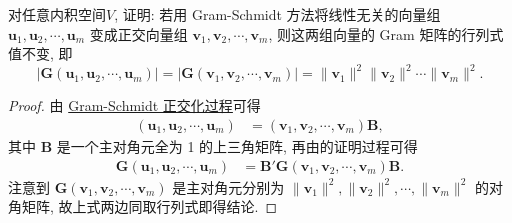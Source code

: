 \documentclass[../../main.tex]{subfiles}%
\begin{document}
\begin{proposition}\label{proposition:例9.15}
对任意内积空间$V$,
证明: 若用 Gram-Schmidt 方法将线性无关的向量组 $\boldsymbol{u}_1,\boldsymbol{u}_2,\cdots,\boldsymbol{u}_m$ 变成正交向量组 $\boldsymbol{v}_1,\boldsymbol{v}_2,\cdots,\boldsymbol{v}_m$, 则这两组向量的 Gram 矩阵的行列式值不变, 即
\[
|\boldsymbol{G}(\boldsymbol{u}_1,\boldsymbol{u}_2,\cdots,\boldsymbol{u}_m)| = |\boldsymbol{G}(\boldsymbol{v}_1,\boldsymbol{v}_2,\cdots,\boldsymbol{v}_m)| = \|\boldsymbol{v}_1\|^2\|\boldsymbol{v}_2\|^2\cdots\|\boldsymbol{v}_m\|^2.
\]
\end{proposition}
\begin{proof}
由 \hyperref[theorem:Gram-Schmidt正交化方法]{Gram-Schmidt 正交化过程}可得
\begin{align*}
(\boldsymbol{u}_1,\boldsymbol{u}_2,\cdots,\boldsymbol{u}_m) &= (\boldsymbol{v}_1,\boldsymbol{v}_2,\cdots,\boldsymbol{v}_m)\boldsymbol{B},
\end{align*}
其中 $\boldsymbol{B}$ 是一个主对角元全为 1 的上三角矩阵, 再由的证明过程可得
\begin{align*}
\boldsymbol{G}(\boldsymbol{u}_1,\boldsymbol{u}_2,\cdots,\boldsymbol{u}_m) &= \boldsymbol{B}'\boldsymbol{G}(\boldsymbol{v}_1,\boldsymbol{v}_2,\cdots,\boldsymbol{v}_m)\boldsymbol{B}.
\end{align*}
注意到 $\boldsymbol{G}(\boldsymbol{v}_1,\boldsymbol{v}_2,\cdots,\boldsymbol{v}_m)$ 是主对角元分别为 $\|\boldsymbol{v}_1\|^2,\|\boldsymbol{v}_2\|^2,\cdots,\|\boldsymbol{v}_m\|^2$ 的对角矩阵, 故上式两边同取行列式即得结论. 
\end{proof}
\end{document}

